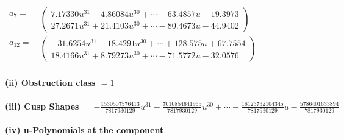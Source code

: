 \documentclass[1p]{elsarticle_modified}
\theoremstyle{definition}
\begin{document}
\begin{tabular}{m{7pt} m{180pt} m{7pt} m{180pt} }
\flushright $a_{7}=$&$\begin{pmatrix}7.17330 u^{31}-4.86084 u^{30}+\cdots-63.4857 u-19.3973\\27.2671 u^{31}+21.4103 u^{30}+\cdots-80.4673 u-44.9402\end{pmatrix}$ \\
\flushright $a_{12}=$&$\begin{pmatrix}-31.6254 u^{31}-18.4291 u^{30}+\cdots+128.575 u+67.7554\\18.4166 u^{31}+8.79273 u^{30}+\cdots-71.5772 u-32.0576\end{pmatrix}$\\&\end{tabular}
\flushleft \textbf{(ii) Obstruction class $= 1$}\\~\\
\flushleft \textbf{(iii) Cusp Shapes $= -\frac{1530507576413}{7817930129} u^{31}-\frac{7010854641965}{7817930129} u^{30}+\cdots-\frac{18123732104345}{7817930129} u-\frac{5786401633894}{7817930129}$}\\~\\
\newpage\renewcommand{\arraystretch}{1}
\flushleft \textbf{(iv) u-Polynomials at the component}\newline \\
\end{document}
